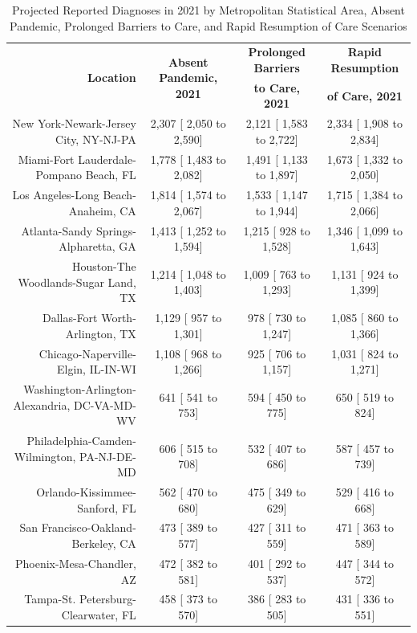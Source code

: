 \documentclass{article}
\begin{document}
\begin{table}[H]
	\caption{Projected Reported Diagnoses in 2021 by Metropolitan Statistical Area, Absent Pandemic, Prolonged Barriers to Care, and Rapid Resumption of Care Scenarios}
	\footnotesize
	\begin{tabular}{|r|c|c|c|}
		\hline
		\multirow{2}{*}{\textbf{Location}} & \multirow{2}{*}{\textbf{Absent Pandemic, 2021}} & \textbf{Prolonged Barriers} & \textbf{Rapid Resumption}\\
		&  & \textbf{to Care, 2021} & \textbf{of Care, 2021}\\
		\hline\hline
		New York-Newark-Jersey City, NY-NJ-PA &  2,307 [ 2,050 to  2,590] &  2,121 [ 1,583 to  2,722] &  2,334 [ 1,908 to  2,834]\\
		Miami-Fort Lauderdale-Pompano Beach, FL &  1,778 [ 1,483 to  2,082] &  1,491 [ 1,133 to  1,897] &  1,673 [ 1,332 to  2,050]\\
		Los Angeles-Long Beach-Anaheim, CA &  1,814 [ 1,574 to  2,067] &  1,533 [ 1,147 to  1,944] &  1,715 [ 1,384 to  2,066]\\
		Atlanta-Sandy Springs-Alpharetta, GA &  1,413 [ 1,252 to  1,594] &  1,215 [   928 to  1,528] &  1,346 [ 1,099 to  1,643]\\
		Houston-The Woodlands-Sugar Land, TX &  1,214 [ 1,048 to  1,403] &  1,009 [   763 to  1,293] &  1,131 [   924 to  1,399]\\
		Dallas-Fort Worth-Arlington, TX &  1,129 [   957 to  1,301] &    978 [   730 to  1,247] &  1,085 [   860 to  1,366]\\
		Chicago-Naperville-Elgin, IL-IN-WI &  1,108 [   968 to  1,266] &    925 [   706 to  1,157] &  1,031 [   824 to  1,271]\\
		Washington-Arlington-Alexandria, DC-VA-MD-WV &    641 [   541 to    753] &    594 [   450 to    775] &    650 [   519 to    824]\\
		Philadelphia-Camden-Wilmington, PA-NJ-DE-MD &    606 [   515 to    708] &    532 [   407 to    686] &    587 [   457 to    739]\\
		Orlando-Kissimmee-Sanford, FL &    562 [   470 to    680] &    475 [   349 to    629] &    529 [   416 to    668]\\
		San Francisco-Oakland-Berkeley, CA &    473 [   389 to    577] &    427 [   311 to    559] &    471 [   363 to    589]\\
		Phoenix-Mesa-Chandler, AZ &    472 [   382 to    581] &    401 [   292 to    537] &    447 [   344 to    572]\\
		Tampa-St. Petersburg-Clearwater, FL &    458 [   373 to    570] &    386 [   283 to    505] &    431 [   336 to    551]\\

\end{tabular}
\end{table}
\end{document}
